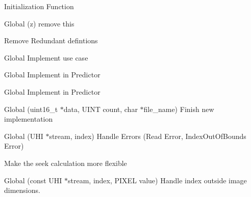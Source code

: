 \begin{DoxyRefList}
Initialization Function  
\item[Global \doxylink{predictor_8h_a2fee6f8dd7f3cd3ed1ae75161294c4c4}{Ps} (z)]\label{todo__todo000012}%
%
remove this 

\label{todo__todo000016}%
%
Remove Redundant defintions  
\item[Global \doxylink{structs__predictor__constants_aa9543722f3ac4cee7db1aa2c20c289e9}{s\+\_\+predictor\+\_\+constants\+::k\+Lossless\+Compression} ]\label{todo__todo000003}%
%
Implement use case  
\item[Global \doxylink{structs__predictor__constants_a28a0b943ff8fd3c6785446e6e6bee86b}{s\+\_\+predictor\+\_\+constants\+::k\+Weight\+Exponent\+Offset\+Flag} ]\label{todo__todo000005}%
%
Implement in Predictor 
\item[Global \doxylink{structs__predictor__constants_adbe6968c0ea7ede4b53717162999a6dd}{s\+\_\+predictor\+\_\+constants\+::k\+Weight\+Initialization} ]\label{todo__todo000004}%
%
Implement in Predictor  
\item[Global \doxylink{csv-io_8h_a3e3e00c9789afb1d2f5f2c7004bd82ad}{Save\+Array\+As\+CSV} (uint16\+\_\+t \texorpdfstring{$\ast$}{*}data, UINT count, char \texorpdfstring{$\ast$}{*}file\+\_\+name)]\label{todo__todo000009}%
%
Finish new implementation  
\item[Global \doxylink{uhi__io_8h_ad7fd2d84633ee6e0355a950deeacd220}{UHI\+\_\+\+Read\+Pixel} (UHI \texorpdfstring{$\ast$}{*}stream, \doxylink{structdim3}{dim3} index)]\label{todo__todo000011}%
%
Handle Errors (Read Error, Index\+Out\+Of\+Bounds Error) 



Make the seek calculation more flexible  
\item[Global \doxylink{uhi__io_8h_a9c23d248f87897f71d177a12cdfebf84}{UHI\+\_\+\+Write\+Pixel} (const UHI \texorpdfstring{$\ast$}{*}stream, \doxylink{structdim3}{dim3} index, PIXEL value)]\label{todo__todo000010}%
%
Handle index outside image dimensions. 
\end{DoxyRefList}